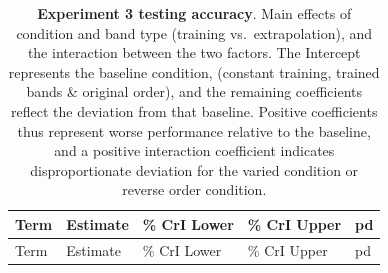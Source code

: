\documentclass[
  11pt,
  letterpaper,
]{article}
\begin{document}
\begin{longtable}[]{@{}
  >{\raggedright\arraybackslash}p{}
  >{\raggedleft\arraybackslash}p{}
  >{\raggedleft\arraybackslash}p{}
  >{\raggedleft\arraybackslash}p{}
  >{\raggedleft\arraybackslash}p{}@{}}
\caption{\textbf{Experiment 3 testing accuracy}. Main effects of
condition and band type (training vs.~extrapolation), and the
interaction between the two factors. The Intercept represents the
baseline condition, (constant training, trained bands \& original
order), and the remaining coefficients reflect the deviation from that
baseline. Positive coefficients thus represent worse performance
relative to the baseline, and a positive interaction coefficient
indicates disproportionate deviation for the varied condition or reverse
order condition.}\label{tbl-e3-bmm-dist}\tabularnewline
\toprule\noalign{}
\begin{minipage}[b]{\linewidth}\raggedright
Term
\end{minipage} & \begin{minipage}[b]{\linewidth}\raggedleft
Estimate
\end{minipage} & \begin{minipage}[b]{\linewidth}\raggedleft
95\% CrI Lower
\end{minipage} & \begin{minipage}[b]{\linewidth}\raggedleft
95\% CrI Upper
\end{minipage} & \begin{minipage}[b]{\linewidth}\raggedleft
pd
\end{minipage} \\
\midrule\noalign{}
\endfirsthead
\toprule\noalign{}
\begin{minipage}[b]{\linewidth}\raggedright
Term
\end{minipage} & \begin{minipage}[b]{\linewidth}\raggedleft
Estimate
\end{minipage} & \begin{minipage}[b]{\linewidth}\raggedleft
95\% CrI Lower
\end{minipage} & \begin{minipage}[b]{\linewidth}\raggedleft
95\% CrI Upper
\end{minipage} & \begin{minipage}[b]{\linewidth}\raggedleft
pd
\end{minipage} \\

\end{longtable}
\end{document}
